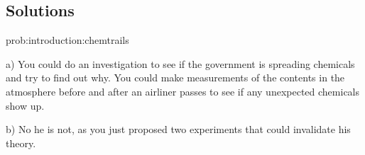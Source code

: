 \subsection{Solutions}
\begin{solution}{prob:introduction:chemtrails}\label{soln:introduction:chemtrails}


a) You could do an investigation to see if the government is spreading chemicals and try to find out why. You could make measurements of the contents in the atmosphere before and after an airliner passes to see if any unexpected chemicals show up.

b) No he is not, as you just proposed two experiments that could invalidate his theory.
\end{solution}





